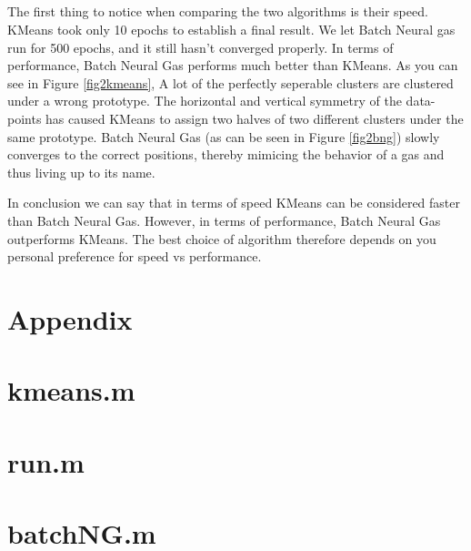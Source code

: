 \documentclass[10pt]{article}
\begin{document}
\subsection{}
The first thing to notice when comparing the two algorithms is their speed.
KMeans took only 10 epochs to establish a final result.
We let Batch Neural gas run for 500 epochs, and it still hasn't converged properly.
In terms of performance, Batch Neural Gas performs much better than KMeans.
As you can see in Figure \ref{fig2kmeans}, A lot of the perfectly seperable clusters are 
clustered under a wrong prototype. 
The horizontal and vertical symmetry of the data-points has caused KMeans to assign two halves of two different clusters under the same prototype.
Batch Neural Gas (as can be seen in Figure \ref{fig2bng}) slowly converges to the correct positions, 
thereby mimicing the behavior of a gas and thus living up to its name.

In conclusion we can say that in terms of speed KMeans can be considered faster than Batch Neural Gas.
However, in terms of performance, Batch Neural Gas outperforms KMeans.
The best choice of algorithm therefore depends on you personal preference for speed vs performance.

\newpage
\section*{Appendix}
\appendix
\section{kmeans.m}
{\label{kmeans}}
\section{run.m}
{\label{run}}
\section{batchNG.m}
{\label{batchNG}}
\end{document}
